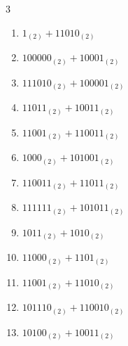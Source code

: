 \begin{multicols}{3}
\begin{enumerate}
  \item $1_{(2)} + 11010_{(2)}$


  \item $100000_{(2)} + 10001_{(2)}$


  \item $111010_{(2)} + 100001_{(2)}$


\columnbreak %

  \item $11011_{(2)} + 10011_{(2)}$


  \item $11001_{(2)} + 110011_{(2)}$


  \item $1000_{(2)} + 101001_{(2)}$


  \item $110011_{(2)} + 11011_{(2)}$


  \item $111111_{(2)} + 101011_{(2)}$


  \item $1011_{(2)} + 1010_{(2)}$


  \item $11000_{(2)} + 1101_{(2)}$


  \item $11001_{(2)} + 11010_{(2)}$


  \item $101110_{(2)} + 110010_{(2)}$


  \item $10100_{(2)} + 10011_{(2)}$


\columnbreak %


\end{enumerate}
\end{multicols}
